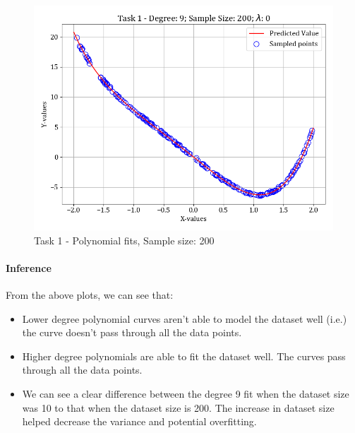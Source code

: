 \documentclass[12pt,a4paper]{article}
\begin{document}
\begin{figure}[H]
    \includegraphics[scale=0.425]{images/t1_d1/d_9_size_200_l_0.png}
    \caption{Task 1 - Polynomial fits, Sample size: 200}
\end{figure}

\paragraph{Inference}
From the above plots, we can see that:
\begin{itemize}
    \itemsep0em
    \item Lower degree polynomial curves aren't able to model the dataset well (i.e.) the curve doesn't pass through all the data points.
    \item Higher degree polynomials are able to fit the dataset well. The curves pass through all the data points.
    \item We can see a clear difference between the degree 9 fit when the dataset size was 10 to that when the dataset size is 200. The increase in dataset size helped decrease the variance and potential overfitting.
\end{itemize}
\end{document}
